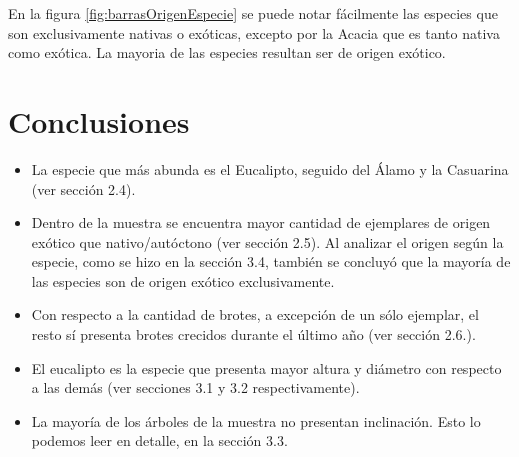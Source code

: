 \documentclass[11pt]{article}
\begin{document}
\newpage

\begin{justify}
  En la figura \ref{fig:barrasOrigenEspecie} se puede notar fácilmente
  las especies que son exclusivamente nativas o exóticas, excepto por la Acacia
  que es tanto nativa como exótica. La mayoria de las especies resultan ser
  de origen exótico.
\end{justify}


\section{Conclusiones}

\begin{itemize}
  \item La especie que más abunda es el Eucalipto, seguido del Álamo y la Casuarina
        (ver sección 2.4).
  \item Dentro de la muestra se encuentra mayor cantidad de ejemplares de origen
        exótico que nativo/autóctono (ver sección 2.5). Al analizar el origen
        según la especie, como se hizo en la sección 3.4, también se concluyó
        que la mayoría de las especies son de origen exótico exclusivamente.
  \item Con respecto a la cantidad de brotes, a excepción de un sólo ejemplar, el
        resto sí presenta brotes crecidos durante el último año (ver sección 2.6.).
  \item El eucalipto es la especie que presenta mayor altura y diámetro con
        respecto a las demás (ver secciones 3.1 y 3.2 respectivamente).
  \item La mayoría de los árboles de la muestra no presentan inclinación. Esto
        lo podemos leer en detalle, en la sección 3.3.
\end{itemize}
\end{document}
